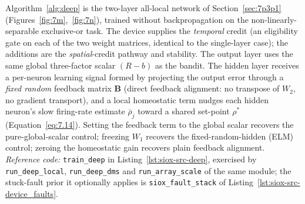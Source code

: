 \noindent Algorithm~\ref{alg:deep} is the two-layer all-local network of
Section~\ref{sec:7p3p1} (Figures~\ref{fig:7m},~\ref{fig:7n}), trained without
backpropagation on the non-linearly-separable exclusive-or task. The device supplies
the \emph{temporal} credit (an eligibility gate on each of the two weight matrices,
identical to the single-layer case); the additions are the \emph{spatial}-credit
pathway and stability. The output layer uses the same global three-factor scalar
$(R-b)$ as the bandit. The hidden layer receives a per-neuron learning signal formed by
projecting the output error through a \emph{fixed random} feedback matrix
$\mathbf{B}$ (direct feedback alignment: no transpose of $W_2$, no gradient transport),
and a local homeostatic term nudges each hidden neuron's slow firing-rate estimate
$\bar\rho_j$ toward a shared set-point $\rho^{\ast}$ (Equation~\ref{eq:7.14}). Setting
the feedback term to the global scalar recovers the pure-global-scalar control; freezing
$W_1$ recovers the fixed-random-hidden (ELM) control; zeroing the homeostatic gain
recovers plain feedback alignment. \emph{Reference code:} \texttt{train\_deep} in
Listing~\ref{lst:siox-src-deep}, exercised by \texttt{run\_deep\_local},
\texttt{run\_deep\_dms} and \texttt{run\_array\_scale} of the same module; the stuck-fault
prior it optionally applies is \texttt{siox\_fault\_stack} of
Listing~\ref{lst:siox-src-device_faults}.

